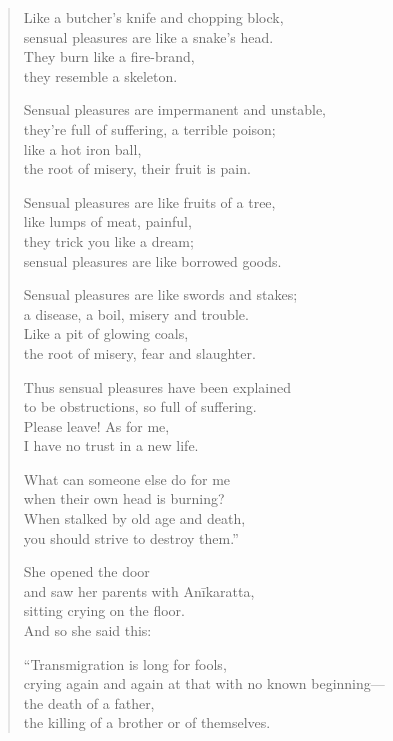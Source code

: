 \documentclass[12pt,openany]{book}%
\begin{document}
\begin{verse}
Like a butcher’s knife and chopping block, \\
sensual pleasures are like a snake’s head. \\
They burn like a fire-brand, \\
they resemble a skeleton. 

Sensual pleasures are impermanent and unstable, \\
they’re full of suffering, a terrible poison; \\
like a hot iron ball, \\
the root of misery, their fruit is pain. 

Sensual pleasures are like fruits of a tree, \\
like lumps of meat, painful, \\
they trick you like a dream; \\
sensual pleasures are like borrowed goods. 

Sensual pleasures are like swords and stakes; \\
a disease, a boil, misery and trouble. \\
Like a pit of glowing coals, \\
the root of misery, fear and slaughter. 

Thus sensual pleasures have been explained \\
to be obstructions, so full of suffering. \\
Please leave! As for me, \\
I have no trust in a new life. 

What can someone else do for me \\
when their own head is burning? \\
When stalked by old age and death, \\
you should strive to destroy them.” 

She opened the door \\
and saw her parents with \textsanskrit{Anīkaratta}, \\
sitting crying on the floor. \\
And so she said this: 

“Transmigration is long for fools, \\
crying again and again at that with no known beginning—\\
the death of a father, \\
the killing of a brother or of themselves. 


\end{verse}
\end{document}
